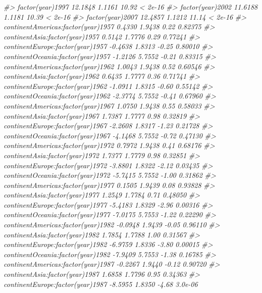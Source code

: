 \documentclass[]{book}
\newenvironment{Shaded}{\begin{snugshade}}{\end{snugshade}}
\newcommand{\CommentTok}[1]{\textcolor[rgb]{0.56,0.35,0.01}{\textit{#1}}}
\begin{document}
\begin{Shaded}
\begin{Highlighting}[]
\CommentTok{#> factor(year)1997                    12.1848     1.1161   10.92  < 2e-16}
\CommentTok{#> factor(year)2002                    11.6188     1.1181   10.39  < 2e-16}
\CommentTok{#> factor(year)2007                    12.4857     1.1212   11.14  < 2e-16}
\CommentTok{#> continentAmericas:factor(year)1957   0.4330     1.9438    0.22  0.82375}
\CommentTok{#> continentAsia:factor(year)1957       0.5142     1.7776    0.29  0.77241}
\CommentTok{#> continentEurope:factor(year)1957    -0.4638     1.8313   -0.25  0.80010}
\CommentTok{#> continentOceania:factor(year)1957   -1.2126     5.7552   -0.21  0.83315}
\CommentTok{#> continentAmericas:factor(year)1962   1.0043     1.9438    0.52  0.60546}
\CommentTok{#> continentAsia:factor(year)1962       0.6435     1.7777    0.36  0.71741}
\CommentTok{#> continentEurope:factor(year)1962    -1.0911     1.8315   -0.60  0.55142}
\CommentTok{#> continentOceania:factor(year)1962   -2.3774     5.7552   -0.41  0.67960}
\CommentTok{#> continentAmericas:factor(year)1967   1.0750     1.9438    0.55  0.58033}
\CommentTok{#> continentAsia:factor(year)1967       1.7387     1.7777    0.98  0.32819}
\CommentTok{#> continentEurope:factor(year)1967    -2.2608     1.8317   -1.23  0.21728}
\CommentTok{#> continentOceania:factor(year)1967   -4.1468     5.7552   -0.72  0.47130}
\CommentTok{#> continentAmericas:factor(year)1972   0.7972     1.9438    0.41  0.68176}
\CommentTok{#> continentAsia:factor(year)1972       1.7377     1.7779    0.98  0.32851}
\CommentTok{#> continentEurope:factor(year)1972    -3.8801     1.8322   -2.12  0.03435}
\CommentTok{#> continentOceania:factor(year)1972   -5.7415     5.7552   -1.00  0.31862}
\CommentTok{#> continentAmericas:factor(year)1977   0.1505     1.9439    0.08  0.93828}
\CommentTok{#> continentAsia:factor(year)1977       1.2549     1.7784    0.71  0.48050}
\CommentTok{#> continentEurope:factor(year)1977    -5.4183     1.8329   -2.96  0.00316}
\CommentTok{#> continentOceania:factor(year)1977   -7.0175     5.7553   -1.22  0.22290}
\CommentTok{#> continentAmericas:factor(year)1982  -0.0948     1.9439   -0.05  0.96110}
\CommentTok{#> continentAsia:factor(year)1982       1.7854     1.7788    1.00  0.31567}
\CommentTok{#> continentEurope:factor(year)1982    -6.9759     1.8336   -3.80  0.00015}
\CommentTok{#> continentOceania:factor(year)1982   -7.9409     5.7553   -1.38  0.16785}
\CommentTok{#> continentAmericas:factor(year)1987  -0.2267     1.9440   -0.12  0.90720}
\CommentTok{#> continentAsia:factor(year)1987       1.6858     1.7796    0.95  0.34363}
\CommentTok{#> continentEurope:factor(year)1987    -8.5955     1.8350   -4.68  3.0e-06}

\end{Highlighting}
\end{Shaded}
\end{document}
